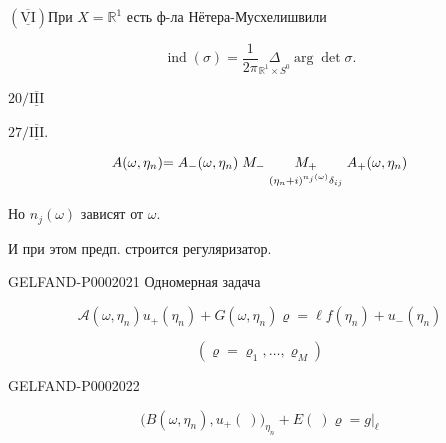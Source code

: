 $(\overline{\underline{\mathrm{VI}}})$\quad При $X=\mathbb R^1$ есть ф-ла Нётера-Мусхелишвили



\begin{equation*}\operatorname{ind}(\sigma)=\frac{1}{2\pi}\underset{\mathbb R^1\times S^0}{\Delta}\arg\det\sigma.\end{equation*}





$20/\overline{\underline{\mathrm{III}}}$\quad{}






$27/\overline{\underline{\mathrm{III}}}$.



\begin{equation*}
\begin{array}{@{}r@{}c@{}c@{\;}c@{\;}c@{\;}l@{}}
A(\omega,\eta_n)&={}&A_-(\omega,\eta_n)&M_-&M_+&A_+(\omega,\eta_n)\\
&&&&\scriptstyle(\eta_n+i)^{n_j(\omega)}\delta_{ij}&
\end{array}
\end{equation*}






Но $n_j(\omega)$ зависят от $\omega$.



И при этом предп. строится регуляризатор.



\begin{GelfandAdjacentEvidence}{GELFAND-P000202}{1}
Одномерная задача



\begin{equation*}\mathcal A(\omega,\eta_n)u_+(\eta_n)+G(\omega,\eta_n)\varrho=\ell f(\eta_n)+u_-(\eta_n)\end{equation*}



\begin{equation*}(\varrho=\varrho_1,\ldots,\varrho_M)\end{equation*}
\end{GelfandAdjacentEvidence}
\begin{GelfandAdjacentEvidence}{GELFAND-P000202}{2}

\begin{equation*}\bigl(B(\omega,\eta_n),u_+(\ )\bigr)_{\eta_n}+E(\ )\varrho=g\big|_\ell\end{equation*}



\end{GelfandAdjacentEvidence}

